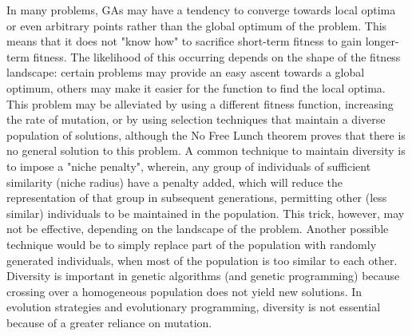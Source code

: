 In many problems, GAs may have a tendency to converge towards local optima or even arbitrary points rather than the global optimum of the problem. This means that it does not "know how" to sacrifice short-term fitness to gain longer-term fitness. The likelihood of this occurring depends on the shape of the fitness landscape: certain problems may provide an easy ascent towards a global optimum, others may make it easier for the function to find the local optima. This problem may be alleviated by using a different fitness function, increasing the rate of mutation, or by using selection techniques that maintain a diverse population of solutions, although the No Free Lunch theorem proves that there is no general solution to this problem. A common technique to maintain diversity is to impose a "niche penalty", wherein, any group of individuals of sufficient similarity (niche radius) have a penalty added, which will reduce the representation of that group in subsequent generations, permitting other (less similar) individuals to be maintained in the population. This trick, however, may not be effective, depending on the landscape of the problem. Another possible technique would be to simply replace part of the population with randomly generated individuals, when most of the population is too similar to each other. Diversity is important in genetic algorithms (and genetic programming) because crossing over a homogeneous population does not yield new solutions. In evolution strategies and evolutionary programming, diversity is not essential because of a greater reliance on mutation.